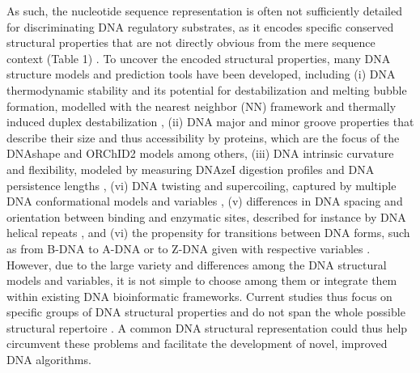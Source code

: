 \documentclass[sigconf]{acmart}
\begin{document}
As such, the nucleotide sequence representation is often not sufficiently detailed for discriminating DNA regulatory substrates, as it encodes specific conserved structural properties that are not directly obvious from the mere sequence context (Table 1) \cite{Zrimec2018-lx,Tosato2017-nq,Slattery2014-ne}. To uncover the encoded structural properties, many DNA structure models and prediction tools have been developed, including (i) DNA thermodynamic stability and its potential for destabilization and melting bubble formation, modelled with the nearest neighbor (NN) framework \cite{SantaLucia1998-hc} and thermally induced duplex destabilization \cite{Zrimec2015-xf}, (ii) DNA major and minor groove properties that describe their size and thus accessibility by proteins, which are the focus of the DNAshape and ORChID2 models \cite{Bishop2011-jm,Chiu2016-kb} among others, (iii) DNA intrinsic curvature and flexibility, modeled by measuring DNAzeI digestion profiles \cite{Brukner1995-pt} and DNA persistence lengths \cite{Geggier2010-mw}, (vi) DNA twisting and supercoiling, captured by multiple DNA conformational models and variables \cite{Karas1996-qz,Olson1998-rw,Perez2004-sx}, (v) differences in DNA spacing and orientation between binding and enzymatic sites, described for instance by DNA helical repeats \cite{Geggier2010-mw}, and (vi) the propensity for transitions between DNA forms, such as from B-DNA to A-DNA or to Z-DNA given with respective variables \cite{Aida1988-iq,Hartmann1989-ji,Kulkarni2013-xm,Ho1986-hg}. However, due to the large variety and differences among the DNA structural models and variables, it is not simple to choose among them or integrate them within existing DNA bioinformatic frameworks. Current studies thus focus on specific groups of DNA structural properties and do not span the whole possible structural repertoire \cite{Chiu2016-kb,Zrimec2018-lx,Zrimec2013-ds,Samee2019-xj,Bansal2014-ko,Chen2012-gd}. A common DNA structural representation could thus help circumvent these problems and facilitate the development of novel, improved DNA algorithms. 
\end{document}

